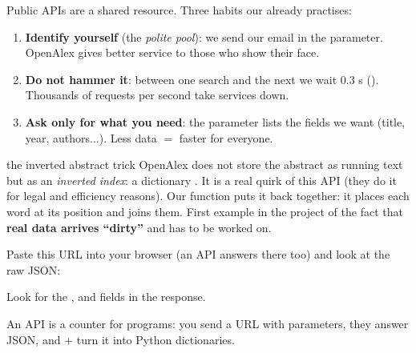 \documentclass[11pt,a4paper]{article}
\begin{document}
Public APIs are a shared resource. Three habits our  already practises:

\begin{enumerate}
  \item \textbf{Identify yourself} (the \emph{polite pool}): we send our email in the
         parameter. OpenAlex gives better service to those who show their face.
  \item \textbf{Do not hammer it}: between one search and the next we wait 0.3 s
        (). Thousands of requests per second take services down.
  \item \textbf{Ask only for what you need}: the  parameter lists the fields we
        want (title, year, authors...). Less data $=$ faster for everyone.
\end{enumerate}

\begin{concepto}{the inverted abstract trick}
OpenAlex does not store the abstract as running text but as an \emph{inverted index}: a
dictionary . It is a real quirk of this API
(they do it for legal and efficiency reasons). Our 
function puts it back together: it places each word at its position and joins them. First
example in the project of the fact that \textbf{real data arrives ``dirty''} and has to be
worked on.
\end{concepto}

\begin{practica}
Paste this URL into your browser (an API answers there too) and look at the raw JSON:
\begin{center}
\small{}
\end{center}
Look for the ,  and
 fields in the response.
\end{practica}

\begin{resumen}
An API is a counter for programs: you send a URL with parameters, they answer JSON, and
 $+$  turn it into Python dictionaries.
\end{resumen}
\clearpage
{}
{}
\end{document}
